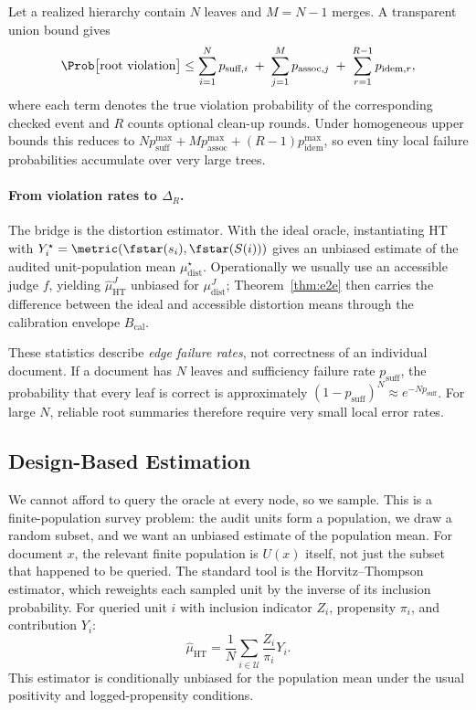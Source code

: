 Let a realized hierarchy contain $N$ leaves and $M = N-1$ merges. A transparent union bound gives
\begin{equation}\label{eq:error_budget}
\Prob\big[\text{root violation}\big]
\le
\sum_{i=1}^{N} p_{\text{suff},i}
\;+\;
\sum_{j=1}^{M} p_{\text{assoc},j}
\;+\;
\sum_{r=1}^{R-1} p_{\text{idem},r},
\end{equation}
where each term denotes the true violation probability of the corresponding checked event and $R$ counts optional clean-up rounds. Under homogeneous upper bounds this reduces to $N p_{\text{suff}}^{\max}+M p_{\text{assoc}}^{\max}+(R-1)p_{\text{idem}}^{\max}$, so even tiny local failure probabilities accumulate over very large trees.

\paragraph{From violation rates to $\Delta_R$.}
The bridge is the distortion estimator. With the ideal oracle, instantiating HT with $Y_i^\star=\metric(\fstar(s_i),\fstar(S(i)))$ gives an unbiased estimate of the audited unit-population mean $\mu_{\mathrm{dist}}^\star$. Operationally we usually use an accessible judge $f$, yielding $\hat{\mu}_{\mathrm{HT}}^{J}$ unbiased for $\mu_{\mathrm{dist}}^{J}$; Theorem~\ref{thm:e2e} then carries the difference between the ideal and accessible distortion means through the calibration envelope $B_{\mathrm{cal}}$.

These statistics describe \emph{edge failure rates}, not correctness of an individual document. If a document has $N$ leaves and sufficiency failure rate $p_{\text{suff}}$, the probability that every leaf is correct is approximately $(1-p_{\text{suff}})^N \approx e^{-Np_{\text{suff}}}$. For large $N$, reliable root summaries therefore require very small local error rates.

\subsection{Design-Based Estimation}

We cannot afford to query the oracle at every node, so we sample. This is a finite-population survey problem: the audit units form a population, we draw a random subset, and we want an unbiased estimate of the population mean. For document $x$, the relevant finite population is $U(x)$ itself, not just the subset that happened to be queried. The standard tool is the Horvitz--Thompson estimator, which reweights each sampled unit by the inverse of its inclusion probability. For queried unit $i$ with inclusion indicator $Z_i$, propensity $\pi_i$, and contribution $Y_i$:
\[
\hat{\mu}_{\mathrm{HT}} = \frac{1}{N}\sum_{i \in \mathcal{U}} \frac{Z_i}{\pi_i}Y_i.
\]
This estimator is conditionally unbiased for the population mean under the usual positivity and logged-propensity conditions.

